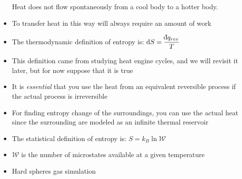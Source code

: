 \documentclass[12pt, openany, letterpaper]{memoir}
\begin{document}
\begin{itemize}
	      Heat does not flow spontaneously from a cool body to a hotter body.
	\item To transfer heat in this way will always require an amount of work
	\item The thermodynamic definition of entropy is: $\mathrm{d}S = \dfrac{\dbar q_{rev}}{T}$
	\item This definition came from studying heat engine cycles, and we will revisit it later, but for now suppose that it is true
	\item It is \emph{essential} that you use the heat from an equivalent reversible process if the actual process is irreversible
	\item For finding entropy change of the surroundings, you can use the actual heat since the surrounding are modeled as an infinite thermal reservoir
	\item The statistical definition of entropy is: $S=k_B\ln\mathcal{W}$
	\item $\mathcal{W}$ is the number of microstates available at a given temperature
	\item Hard spheres gas simulation
\end{itemize}
\end{document}

